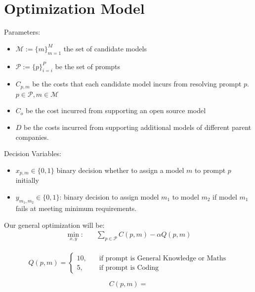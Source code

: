 \documentclass{report}
\begin{document}
\section{Optimization Model}
Parameters:
\begin{itemize}
	\item $\mathcal{M} := \{m\}_{m=1}^{M}$ the set of candidate models
	\item $\mathcal{P} := \{p\}_{i=i}^{P}$ be the set of prompts
	\item $C_{p, m} $ be the costs that each candidate model incurs from resolving prompt $p$. $p \in \mathcal{P}, m \in \mathcal{M}$  
	\item $C_{o}$ be the cost incurred from supporting an open source model
	\item $D$ be the costs incurred from supporting additional models of different parent companies.
\end{itemize}

\noindent
Decision Variables: 
\begin{itemize}
	\item $x_{p,m} \in \{0,1\}$ binary decision whether to assign a model $m$ to prompt $p$ initially
	\item $y_{m_1, m_2} \in \{0,1\}$: binary decision to assign model $m_1$ to model $m_2$ if model $m_1$ fails at meeting minimum requirements.
\end{itemize}

Our general optimization will be: 
\begin{align*}
	\min_{x, y}: \quad & \sum_{p \in \mathcal{P}}C(p, m) - \alpha Q(p, m) \\
\end{align*}



\[
Q(p, m) = \begin{cases}
	10, \quad &\text{if prompt is General Knowledge or Maths} \\
	5, &\text{if prompt is Coding}
\end{cases}
\]

\[
C(p, m) =


\]
\end{document}
